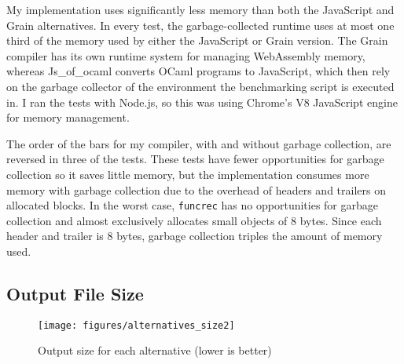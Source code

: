 My implementation uses significantly less memory than both the JavaScript and Grain alternatives. In every test, %
the garbage-collected runtime uses at most one third of the memory used by either the JavaScript or Grain version. 
The Grain compiler has its own runtime system for managing WebAssembly memory, whereas Js\_of\_ocaml converts OCaml programs to JavaScript, which then rely on the garbage collector of the environment the benchmarking script is executed in. I ran the tests with Node.js, so this was using Chrome's V8 JavaScript engine for memory management.


The order of the bars for my compiler, with and without garbage collection, are reversed in three of the tests. These tests have fewer opportunities for garbage collection so it saves little memory, but the implementation consumes more memory with garbage collection due to the overhead of headers and trailers on allocated blocks. In the worst case, \verb|funcrec| has no opportunities for garbage collection and almost exclusively allocates small objects of 8 bytes. Since each header and trailer is 8 bytes, garbage collection triples the amount of memory used.



\subsection{Output File Size}

\begin{figure}[H]
\hspace{-1.2cm}
\texttt{[image: figures/alternatives\_size2]}
\vspace{-0.8cm}
\caption{Output size for each alternative (lower is better)}
 \label{fig:alt_size} 
\end{figure}

